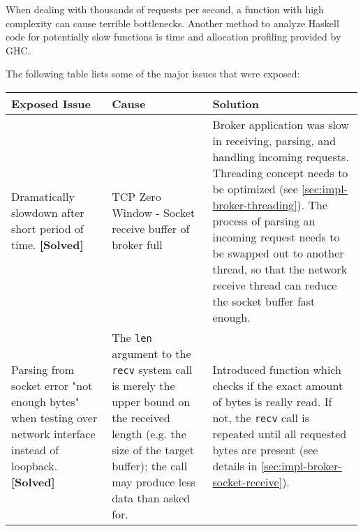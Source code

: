 When dealing with thousands of requests per second, a function with high complexity
can cause terrible bottlenecks. Another method to analyze Haskell code for
potentially slow functions is time and allocation profiling provided by GHC.

The following table lists some of the major issues that were exposed:

\begin{table}[H]
\begin{tabular}{|p{3cm}|p{4.5cm}|p{6cm}|}
\hline
{\bf Exposed Issue}                                                                                  & {\bf Cause}                                                                                                                                                                                                                 & {\bf Solution}                                                                                                                                                                                                                                                                                    \\ \hline
Dramatically slowdown after short period of time. \textbf{[Solved]}                                                        & TCP Zero Window - Socket receive buffer of broker full                                                                                                                                                                      & Broker application was slow in receiving, parsing, and handling incoming requests. Threading concept needs to be optimized (see \ref{sec:impl-broker-threading}). The process of parsing an incoming request needs to be swapped out to another thread, so that the network receive thread can reduce the socket buffer fast enough. \\ \hline
Parsing from socket error "not enough bytes" when testing over network
interface instead of loopback. \textbf{[Solved]} & The \lstinline{len} argument to the
\lstinline{recv} system call is merely the upper bound on the received length
(e.g. the size of the target buffer); the call may produce less data than asked
for. & Introduced function which checks if the exact amount of bytes is really
read. If not, the \lstinline{recv} call is repeated until all requested bytes are present (see details in \ref{sec:impl-broker-socket-receive}).                                                                                                                                              \\ \hline

\end{tabular}
\end{table}
